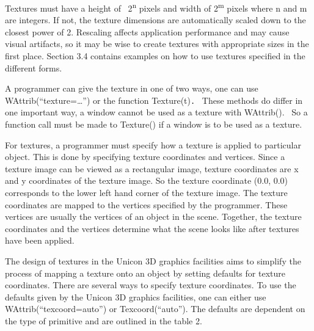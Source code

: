 \documentclass[letterpaper]{article}
\begin{document}
{
Textures must have a height of \ 2\textsuperscript{n} pixels and width of 2\textsuperscript{m} pixels where n and m are
integers. If not, the texture dimensions are automatically scaled down to the closest power of 2. Rescaling affects
application performance and may cause visual artifacts, so it may be wise to create textures with appropriate sizes in
the first place. Section 3.4 contains examples on how to use textures specified in the different forms. }

{
A programmer can give the texture in one of two ways, one can use \textsf{WAttrib(``texture={\dots}'') }or the function
\textsf{Texture(t)}\texttt{.} \ These methods do differ in one important way, a window cannot be used as a texture with
\textsf{WAttrib()}. \ So a function call must be made to \textsf{Texture()} if a window is to be used as a texture. }

{
For textures, a programmer must specify how a texture is applied to particular object. This is done by specifying
texture coordinates and vertices. Since a texture image can be viewed as a rectangular image, texture coordinates are x
and y coordinates of the texture image. So the texture coordinate \textsf{(0.0, 0.0)} corresponds to the lower left
hand corner of the texture image. The texture coordinates are mapped to the vertices specified by the programmer. These
vertices are usually the vertices of an object in the scene. Together, the texture coordinates and the vertices
determine what the scene looks like after textures have been applied. }

{
The design of textures in the Unicon 3D graphics facilities aims to simplify the process of mapping a texture onto an
object by setting defaults for texture coordinates. There are several ways to specify texture coordinates. To use the
defaults given by the Unicon 3D graphics facilities, one can either use \textsf{WAttrib(``texcoord=auto'')} or
\textsf{Texcoord(``auto'')}. The defaults are dependent on the type of primitive and are outlined in the table 2.}
\end{document}
